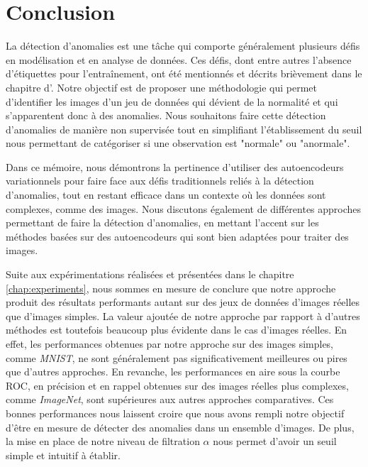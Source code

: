 \chapter*{Conclusion}           %
\label{chap:conclusion}         %

La détection d'anomalies est une tâche qui comporte généralement plusieurs défis en modélisation et en analyse de données. Ces défis, dont entre autres l'absence d'étiquettes pour l'entraînement, ont été mentionnés et décrits brièvement dans le chapitre d'. Notre objectif est de proposer une méthodologie qui permet d'identifier les images d'un jeu de données qui dévient de la normalité et qui s'apparentent donc à des anomalies. Nous souhaitons faire cette détection d'anomalies de manière non supervisée tout en simplifiant l'établissement du seuil nous permettant de catégoriser si une observation est "normale" ou  "anormale". 

Dans ce mémoire, nous démontrons la pertinence d'utiliser des autoencodeurs variationnels pour faire face aux défis traditionnels reliés à la détection d'anomalies, tout en restant efficace dans un contexte où les données sont complexes, comme des images. Nous discutons également de différentes approches permettant de faire la détection d'anomalies, en mettant l'accent sur les méthodes basées sur des autoencodeurs qui sont bien adaptées pour traiter des images.

Suite aux expérimentations réalisées et présentées dans le chapitre \ref{chap:experiments}, nous sommes en mesure de conclure que notre approche produit des résultats performants autant sur des jeux de données d'images réelles que d'images simples. La valeur ajoutée de notre approche par rapport à d'autres méthodes est toutefois beaucoup plus évidente dans le cas d'images réelles. En effet, les performances obtenues par notre approche sur des images simples, comme \textit{MNIST}, ne sont généralement pas significativement meilleures ou pires que d'autres approches. En revanche, les performances en aire sous la courbe ROC, en précision et en rappel obtenues sur des images réelles plus complexes, comme \textit{ImageNet}, sont supérieures aux autres approches comparatives. Ces bonnes performances nous laissent croire que nous avons rempli notre objectif d'être en mesure de détecter des anomalies dans un ensemble d'images. De plus, la mise en place de notre niveau de filtration $\alpha$ nous permet d'avoir un seuil simple et intuitif à établir.


